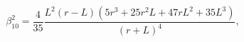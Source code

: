 \begin{equation}
\beta_{10}^{2}=\frac{4}{35}\frac{L^2(r-L)(5r^3+25r^2L+47rL^2+35L^3)}{(r+L)^4},
\label{beta3}
\end{equation}

